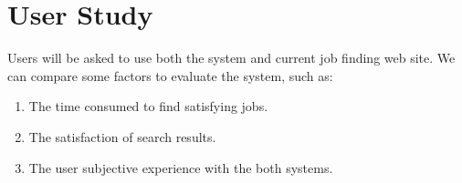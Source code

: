 \section{User Study}
Users will be asked to use both the system and current job finding web site. We can compare some factors to evaluate the system, such as:
\begin{enumerate}
    \item The time consumed to find satisfying jobs.
    \item The satisfaction of search results.
    \item The user subjective experience with the both systems.
\end{enumerate}

